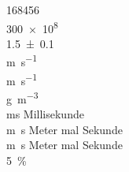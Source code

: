 \documentclass{scrartcl}
\begin{document}
\num{168456} \\ %
\num{300e8} \\ %
\num{1,5 +- 0,1} \\ %
\si{\meter\per\second} \\
\si[per-mode=fraction]{\meter\per\second} \\ %
\si[per-mode=reciprocal]{\gram\per\cubic\meter} \\ %
\si{\milli\second} Millisekunde \\
\si{\meter\second} Meter mal Sekunde \\
\si[inter-unit-product=\cdot]{\meter\second} Meter mal Sekunde
\\
\SI{5}{\percent} %
\end{document}
